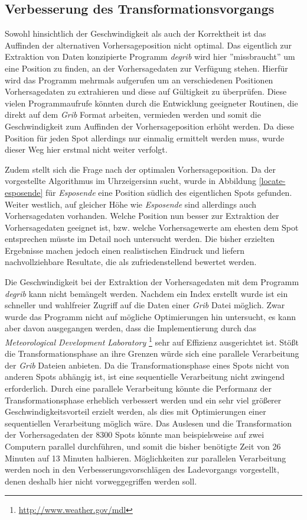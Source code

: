 \subsection{Verbesserung des Transformationsvorgangs}
Sowohl hinsichtlich der Geschwindigkeit als auch der Korrektheit ist
das Auffinden der alternativen Vorhersageposition nicht optimal. Das
eigentlich zur Extraktion von Daten konzipierte Programm
\textit{degrib} wird hier ''missbraucht'' um eine Position zu finden,
an der Vorhersagedaten zur Verfügung stehen. Hierfür wird das Programm
mehrmals aufgerufen um an verschiedenen Positionen Vorhersagedaten zu
extrahieren und diese auf Gültigkeit zu überprüfen. Diese vielen
Programmaufrufe könnten durch die Entwicklung geeigneter Routinen, die
direkt auf dem \textit{Grib} Format arbeiten, vermieden werden und
somit die Geschwindigkeit zum Auffinden der Vorhersageposition erhöht
werden. Da diese Position für jeden Spot allerdings nur einmalig
ermittelt werden muss, wurde dieser Weg hier erstmal nicht weiter
verfolgt.

Zudem stellt sich die Frage nach der optimalen Vorhersageposition. Da
der vorgestellte Algorithmus im Uhrzeigersinn sucht, wurde in
Abbildung \ref{locate-esposende} für \textit{Esposende} eine Position
südlich des eigentlichen Spots gefunden. Weiter westlich, auf gleicher
Höhe wie \textit{Esposende} sind allerdings auch Vorhersagedaten
vorhanden. Welche Position nun besser zur Extraktion der
Vorhersagedaten geeignet ist, bzw. welche Vorhersagewerte am ehesten
dem Spot entsprechen müsste im Detail noch untersucht werden. Die
bisher erzielten Ergebnisse machen jedoch einen realistischen Eindruck
und liefern nachvollziehbare Resultate, die als zufriedenstellend
bewertet werden.

Die Geschwindigkeit bei der Extraktion der Vorhersagedaten mit dem
Programm \textit{degrib} kann nicht bemängelt werden. Nachdem ein
Index erstellt wurde ist ein schneller und wahlfreier Zugriff auf die
Daten einer \textit{Grib} Datei möglich. Zwar wurde das Programm nicht
auf mögliche Optimierungen hin untersucht, es kann aber davon
ausgegangen werden, dass die Implementierung durch das
\textit{Meteorological Development Laboratory}
\footnote{\url{http://www.weather.gov/mdl}} sehr auf Effizienz
ausgerichtet ist. Stößt die Transformationsphase an ihre Grenzen würde
sich eine parallele Verarbeitung der \textit{Grib} Dateien
anbieten. Da die Transformationsphase eines Spots nicht von anderen
Spots abhängig ist, ist eine sequentielle Verarbeitung nicht zwingend
erforderlich. Durch eine parallele Verarbeitung könnte die Performanz
der Transformationsphase erheblich verbessert werden und ein sehr viel
größerer Geschwindigkeitsvorteil erzielt werden, als dies mit
Optimierungen einer sequentiellen Verarbeitung möglich wäre. Das
Auslesen und die Transformation der Vorhersagedaten der 8300 Spots
könnte man beispielsweise auf zwei Computern parallel durchführen, und
somit die bisher benötigte Zeit von 26 Minuten auf 13 Minuten
halbieren. Möglichkeiten zur parallelen Verarbeitung werden noch in
den Verbesserungsvorschlägen des Ladevorgangs vorgestellt, denen
deshalb hier nicht vorweggegriffen werden soll.

